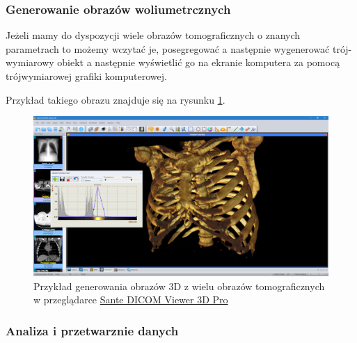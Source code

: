 \subsubsection{Generowanie obrazów woliumetrcznych}

Jeżeli mamy do dyspozycji wiele obrazów tomograficznych o znanych parametrach to możemy wczytać je, posegregować a następnie wygenerować trój-wymiarowy obiekt a następnie wyświetlić go na ekranie komputera za pomocą trójwymiarowej grafiki komputerowej.

Przykład takiego obrazu znajduje się na rysunku \ref{fig:dicomviewer002}.

\begin{figure}[!htbp]
    \centering
    \includegraphics[width=\textwidth]{img/dicom-viewer-002.png}
    \caption{Przykład generowania obrazów 3D z wielu obrazów tomograficznych w przeglądarce \href{https://www.santesoft.com/win/sante-dicom-viewer-3d-pro/sante-dicom-viewer-3d-pro.html}{Sante DICOM Viewer 3D Pro}}
    \label{fig:dicomviewer002}
\end{figure}

\subsubsection{Analiza i przetwarznie danych}

